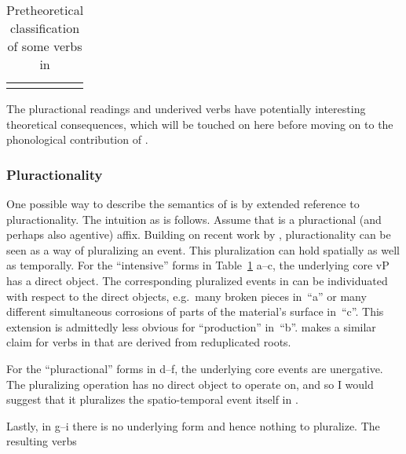 \begin{exe}
\begin{xlist}
\begin{exe}
\begin{xlist}
\begin{exe}
\begin{xlist}
\begin{exe}
\begin{exe}
\begin{xlist}
\begin{exe}
\begin{xlist}
\begin{exe}
\begin{xlist}
\begin{exe}
\begin{xlist}
\begin{exe}
\begin{xlist}
\begin{exe}
\begin{xlist}
\begin{exe}
\begin{xlist}
\begin{exe}
\begin{xlist}
\begin{exe}
\begin{xlist}
\begin{exe}
\begin{xlist}
\begin{exe}
\begin{xlist}
\begin{exe}
\begin{xlist}
\begin{exe}
\begin{xlist}
\begin{exe}
\begin{exe}
\begin{xlist}
\begin{exe}
\begin{xlist}
\begin{exe}
\begin{xlist}
\begin{exe}
\begin{xlist}
{\begin{exe}
\begin{xlist}
\begin{exe}
\begin{xlist}
\begin{exe}
\begin{xlist}
\begin{exe}
\begin{xlist}
\begin{xlist}
\begin{xlist}
\begin{exe}
\begin{xlist}
\begin{xlist}
\begin{xlist}
\begin{exe}
\begin{exe}
\begin{xlist}
\begin{exe}
\begin{xlist}
\begin{exe}
\begin{xlist}
\begin{exe}
\begin{xlist}
\begin{exe}
\begin{xlist}
\begin{exe}
\begin{xlist}
\begin{exe}
\begin{xlist}
\begin{exe}
\begin{exe}
\begin{xlist}
\begin{xlist}
\begin{exe}
\begin{xlist}
\begin{exe}
\begin{xlist}
\begin{exe}
\begin{xlist}
\begin{exe}
\begin{xlist}
\begin{exe}
\begin{xlist}
\begin{exe}
\begin{xlist}
\begin{exe}
\begin{exe}
\begin{xlist}
\begin{exe}
\begin{xlist}
\begin{exe}
\begin{xlist}
\begin{exe}
\begin{xlist}
\begin{table}
\begin{tabular}{llllll}
		\lspbottomrule
	\end{tabular}
	\caption{Pretheoretical classification of some verbs in {\tpie}\label{table:voice:piel-meanings2}}
\end{table}

The pluractional readings and underived verbs have potentially interesting theoretical consequences, which will be touched on here before moving on to the phonological contribution of {\va}.

		\subsubsection{Pluractionality} \label{voice:va:sem:plural}
One possible way to describe the semantics of {\va} is by extended reference to pluractionality. The intuition as is follows. Assume that {\va} is a pluractional (and perhaps also agentive) affix. Building on recent work by \cite{henderson12phd,henderson17nllt}, pluractionality can be seen as a way of pluralizing an event. This pluralization can hold spatially as well as temporally. For the ``intensive'' forms in Table~\ref{table:voice:piel-meanings2} a--c, the underlying core vP has a direct object. The corresponding pluralized events in {\tpie} can be individuated with respect to the direct objects, e.g.~many broken pieces in~``a'' or many different simultaneous corrosions of parts of the material's surface in~``c''. This extension is admittedly less obvious for ``production'' in~``b''. \cite{greenberg10} makes a similar claim for verbs in {\tpie} that are derived from reduplicated roots.

For the ``pluractional'' forms in d--f, the underlying core events are unergative. The pluralizing operation has no direct object to operate on, and so I would suggest that it pluralizes the spatio-temporal event itself in {\tpie}.

Lastly, in g--i there is no underlying form and hence nothing to pluralize. The resulting verbs 
\end{xlist}
\end{exe}
\end{xlist}
\end{exe}
\end{xlist}
\end{exe}
\end{xlist}
\end{exe}
\end{exe}
\end{xlist}
\end{exe}
\end{xlist}
\end{exe}
\end{xlist}
\end{exe}
\end{xlist}
\end{exe}
\end{xlist}
\end{exe}
\end{xlist}
\end{exe}
\end{xlist}
\end{xlist}
\end{exe}
\end{exe}
\end{xlist}
\end{exe}
\end{xlist}
\end{exe}
\end{xlist}
\end{exe}
\end{xlist}
\end{exe}
\end{xlist}
\end{exe}
\end{xlist}
\end{exe}
\end{xlist}
\end{exe}
\end{exe}
\end{xlist}
\end{xlist}
\end{xlist}
\end{exe}
\end{xlist}
\end{xlist}
\end{xlist}
\end{exe}
\end{xlist}
\end{exe}
\end{xlist}
\end{exe}
\end{xlist}
\end{exe}}
\end{xlist}
\end{exe}
\end{xlist}
\end{exe}
\end{xlist}
\end{exe}
\end{xlist}
\end{exe}
\end{exe}
\end{xlist}
\end{exe}
\end{xlist}
\end{exe}
\end{xlist}
\end{exe}
\end{xlist}
\end{exe}
\end{xlist}
\end{exe}
\end{xlist}
\end{exe}
\end{xlist}
\end{exe}
\end{xlist}
\end{exe}
\end{xlist}
\end{exe}
\end{xlist}
\end{exe}
\end{xlist}
\end{exe}
\end{xlist}
\end{exe}
\end{xlist}
\end{exe}
\end{exe}
\end{xlist}
\end{exe}
\end{xlist}
\end{exe}
\end{xlist}
\end{exe}
